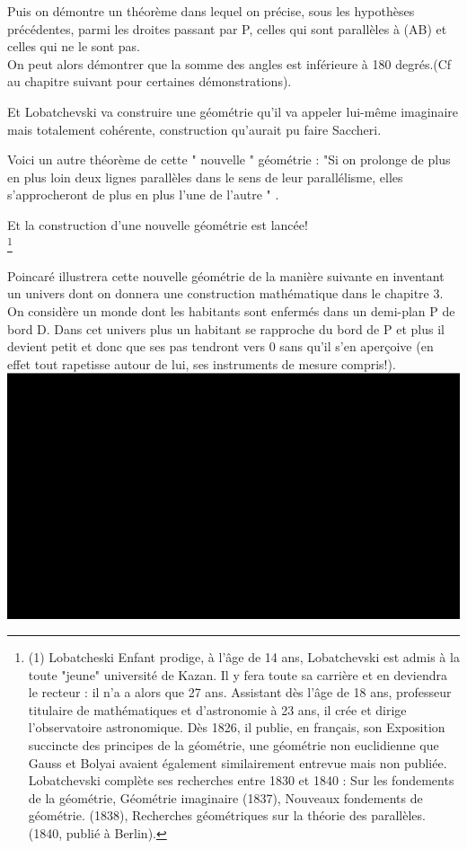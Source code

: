 \documentclass[a4paper, 12pt, twoside]{book}
\begin{document}
 Puis on démontre un théorème dans lequel on précise, sous les hypothèses précédentes, parmi les droites passant par P, celles qui sont parallèles à (AB) et celles qui ne le sont pas.\\
 
   On peut alors démontrer que la somme des angles est inférieure à 180 degrés.(Cf au chapitre suivant pour certaines démonstrations).

  Et Lobatchevski va construire une géométrie qu'il va appeler lui-même imaginaire mais totalement cohérente, construction qu'aurait pu faire Saccheri.

   Voici un autre théorème de cette " nouvelle " géométrie : 
  "Si on prolonge de plus en plus loin deux lignes parallèles dans le sens de leur parallélisme, elles s'approcheront de plus en plus l'une de l'autre " .
   

     Et la construction d'une nouvelle géométrie est lancée!\\
     
      \footnote{(1)  Lobatcheski Enfant prodige, à l'âge de 14 ans, Lobatchevski est admis à la toute "jeune" université de Kazan. Il y fera toute sa carrière et en deviendra le recteur : il n'a a alors que 27 ans. 
Assistant dès l'âge de 18 ans, professeur titulaire de mathématiques et d'astronomie à 23 ans, il crée et dirige l'observatoire astronomique. Dès 1826, il publie, en français, son Exposition succincte des principes de la géométrie, une géométrie non euclidienne que Gauss et Bolyai avaient également similairement entrevue mais non publiée. 
Lobatchevski complète ses recherches entre 1830 et 1840 : Sur les fondements de la géométrie, Géométrie imaginaire (1837), Nouveaux fondements de géométrie. (1838), Recherches géométriques sur la théorie des parallèles. (1840, publié à Berlin). }
     
      Poincaré illustrera cette nouvelle géométrie de la manière suivante en inventant un univers dont on donnera  une construction mathématique dans le chapitre 3.\\
  
       On considère un monde dont les habitants sont enfermés dans un demi-plan P  de bord D. Dans cet univers plus un habitant se rapproche du bord de P et plus il devient petit et donc que ses pas tendront vers 0 sans qu'il s'en aperçoive (en effet tout rapetisse autour de lui, ses instruments de mesure compris!).\\
       
  \includegraphics[scale=0.7]{figures/poinc.eps}   
     
\end{document}
